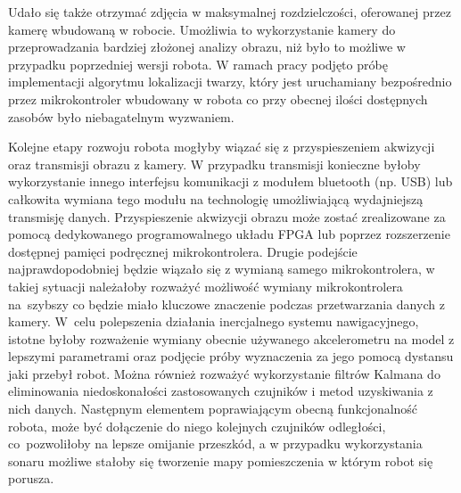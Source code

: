 Udało się także otrzymać zdjęcia w maksymalnej rozdzielczości, oferowanej przez kamerę
wbudowaną w robocie. Umożliwia to wykorzystanie kamery do przeprowadzania
bardziej złożonej analizy obrazu, niż było to możliwe w przypadku poprzedniej
wersji robota. W ramach pracy podjęto próbę implementacji algorytmu
lokalizacji twarzy, który jest uruchamiany bezpośrednio przez mikrokontroler
wbudowany w robota co przy obecnej ilości dostępnych zasobów było niebagatelnym
wyzwaniem.

Kolejne etapy rozwoju robota mogłyby wiązać się z przyspieszeniem akwizycji oraz
transmisji obrazu z kamery. W przypadku transmisji konieczne byłoby
wykorzystanie innego interfejsu komunikacji z modułem bluetooth (np. USB) lub
całkowita wymiana tego modułu na technologię umożliwiającą
wydajniejszą transmisję danych. Przyspieszenie akwizycji obrazu może zostać
zrealizowane za pomocą dedykowanego programowalnego układu FPGA lub poprzez rozszerzenie dostępnej pamięci podręcznej mikrokontrolera.
Drugie podejście najprawdopodobniej będzie wiązało się z wymianą samego
mikrokontrolera, w takiej sytuacji należałoby rozważyć możliwość wymiany
mikrokontrolera na~szybszy co będzie miało kluczowe znaczenie podczas
przetwarzania danych z kamery. W~celu polepszenia działania inercjalnego systemu
nawigacyjnego, istotne byłoby rozważenie wymiany obecnie używanego akcelerometru
na model z lepszymi parametrami oraz podjęcie próby wyznaczenia za jego pomocą
dystansu jaki przebył robot. Można również rozważyć wykorzystanie
filtrów Kalmana do eliminowania niedoskonałości zastosowanych czujników
i metod uzyskiwania z nich danych. Następnym elementem poprawiającym obecną
funkcjonalność robota, może być dołączenie do niego kolejnych czujników
odległości, co~pozwoliłoby na lepsze omijanie przeszkód, a w przypadku
wykorzystania sonaru możliwe stałoby się tworzenie mapy pomieszczenia w którym
robot się porusza. 
